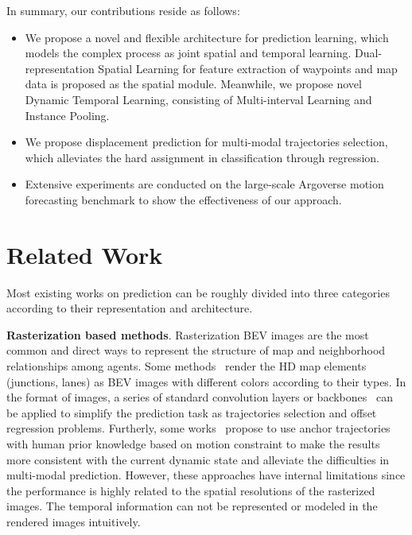 \documentclass[final]{cvpr}
\begin{document}
In summary, our contributions reside as follows:
\begin{itemize}
   \item We propose a novel and flexible architecture for prediction learning, which models the complex process as joint spatial and temporal learning. Dual-representation Spatial Learning for feature extraction of waypoints and map data is proposed as the spatial module. Meanwhile, we propose novel Dynamic Temporal Learning, consisting of Multi-interval Learning and Instance Pooling. 
   \item We propose displacement prediction for multi-modal trajectories selection, which alleviates the hard assignment in classification through regression.
   \item Extensive experiments are conducted on the large-scale Argoverse motion forecasting benchmark to show the effectiveness of our approach.
\end{itemize}


\section{Related Work}
Most existing works on prediction can be roughly divided into three categories according to their representation and architecture.

\noindent\textbf{Rasterization based methods}. Rasterization BEV images are the most common and direct ways to represent the structure of map and neighborhood relationships among agents. 
Some methods~\cite{bansal2018chauffeurnet,casas2018intentnet,luoFastFuriousReal2018,phan2020covernet} render the HD map elements (junctions, lanes) as BEV images with different colors according to their types. In the format of images, a series of standard convolution layers or backbones~\cite{he2016deep} can be applied to simplify the prediction task as trajectories selection and offset regression problems. Furtherly, some
works~\cite{chai2019multipath,phan2020covernet} propose to use anchor trajectories with human prior knowledge based on motion constraint to make the results more consistent with the current dynamic state and alleviate the difficulties in multi-modal prediction. However, these approaches have internal limitations since the performance is highly related to the spatial resolutions of the rasterized images. The temporal information can not be represented or modeled in the rendered images intuitively. 
\end{document}
